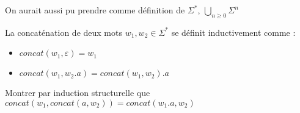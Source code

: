 \begin{rem}
	On aurait aussi pu prendre comme définition de $\Sigma^*$, $\bigcup\limits_{n \geq 0} \Sigma^n$
\end{rem}

\begin{definition}
	La concaténation de deux mots $w_1, w_2 \in \Sigma^*$ se définit inductivement comme : \begin{itemize}
		\item $concat(w_1, \varepsilon) = w_1$
		\item $concat(w_1, w_2.a) = concat(w_1, w_2).a$
	\end{itemize}
\end{definition}

\begin{exercise}
	Montrer par induction structurelle que $concat(w_1, concat(a, w_2)) = concat(w_1.a, w_2)$ 
\end{exercise}